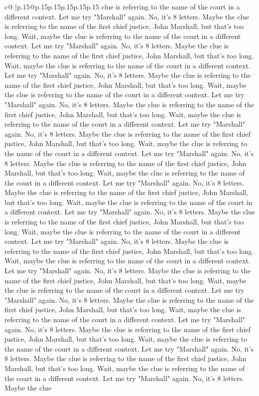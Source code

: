 \documentclass{article}
\begin{document}
{\begin{supertabular}{c@{$\;$}|p{.15\linewidth}@{}p{.15\linewidth}p{.15\linewidth}p{.15\linewidth}p{.15\linewidth}p{.15\linewidth}}
{{{clue is referring to the name of the court in a different context. Let me try "Marshall" again. No, it's 8 letters. Maybe the clue is referring to the name of the first chief justice, John Marshall, but that's too long. Wait, maybe the clue is referring to the name of the court in a different context. Let me try "Marshall" again. No, it's 8 letters. Maybe the clue is referring to the name of the first chief justice, John Marshall, but that's too long. Wait, maybe the clue is referring to the name of the court in a different context. Let me try "Marshall" again. No, it's 8 letters. Maybe the clue is referring to the name of the first chief justice, John Marshall, but that's too long. Wait, maybe the clue is referring to the name of the court in a different context. Let me try "Marshall" again. No, it's 8 letters. Maybe the clue is referring to the name of the first chief justice, John Marshall, but that's too long. Wait, maybe the clue is referring to the name of the court in a different context. Let me try "Marshall" again. No, it's 8 letters. Maybe the clue is referring to the name of the first chief justice, John Marshall, but that's too long. Wait, maybe the clue is referring to the name of the court in a different context. Let me try "Marshall" again. No, it's 8 letters. Maybe the clue is referring to the name of the first chief justice, John Marshall, but that's too long. Wait, maybe the clue is referring to the name of the court in a different context. Let me try "Marshall" again. No, it's 8 letters. Maybe the clue is referring to the name of the first chief justice, John Marshall, but that's too long. Wait, maybe the clue is referring to the name of the court in a different context. Let me try "Marshall" again. No, it's 8 letters. Maybe the clue is referring to the name of the first chief justice, John Marshall, but that's too long. Wait, maybe the clue is referring to the name of the court in a different context. Let me try "Marshall" again. No, it's 8 letters. Maybe the clue is referring to the name of the first chief justice, John Marshall, but that's too long. Wait, maybe the clue is referring to the name of the court in a different context. Let me try "Marshall" again. No, it's 8 letters. Maybe the clue is referring to the name of the first chief justice, John Marshall, but that's too long. Wait, maybe the clue is referring to the name of the court in a different context. Let me try "Marshall" again. No, it's 8 letters. Maybe the clue is referring to the name of the first chief justice, John Marshall, but that's too long. Wait, maybe the clue is referring to the name of the court in a different context. Let me try "Marshall" again. No, it's 8 letters. Maybe the clue is referring to the name of the first chief justice, John Marshall, but that's too long. Wait, maybe the clue is referring to the name of the court in a different context. Let me try "Marshall" again. No, it's 8 letters. Maybe the clue is referring to the name of the first chief justice, John Marshall, but that's too long. Wait, maybe the clue is referring to the name of the court in a different context. Let me try "Marshall" again. No, it's 8 letters. Maybe the clue }}}
\end{supertabular}}
\end{document}
